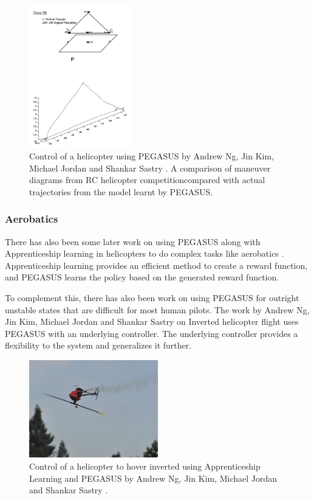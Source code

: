 \documentclass[hidelinks,BTech]{iitmdiss}
\begin{document}
\begin{figure}[H]
  \centering
    \includegraphics[width=0.4\textwidth]{pegasus_helicopter.png}
    \caption{Control of a helicopter using PEGASUS by Andrew Ng, Jin Kim, Michael Jordan and Shankar Sastry \cite{HelicopterPegasus}. A comparison of maneuver diagrams from RC helicopter competition\protect\footnotemark \space compared with actual trajectories from the model learnt by PEGASUS.}
\end{figure}

\subsubsection{Aerobatics}

There has also been some later work on using PEGASUS along with Apprenticeship learning in helicopters to do complex tasks like aerobatics \cite{ApprenticeshipHelicopterAerobatics}. Apprenticeship learning provides an efficient method to create a reward function, and PEGASUS learns the policy based on the generated reward function.

To complement this, there has also been work on using PEGASUS for outright unstable states that are difficult for most human pilots. The work by Andrew Ng, Jin Kim, Michael Jordan and Shankar Sastry on Inverted helicopter flight \cite{InvertedHelicopterFlight} uses PEGASUS with an underlying controller. The underlying controller provides a flexibility to the system and generalizes it further.

\begin{figure}[H]
  \centering
    \includegraphics[width=0.5\textwidth]{pegasus_inverted_helicopter.png}
    \caption{Control of a helicopter to hover inverted using Apprenticeship Learning and PEGASUS by Andrew Ng, Jin Kim, Michael Jordan and Shankar Sastry \cite{InvertedHelicopterFlight}.}
\end{figure}
\end{document}
